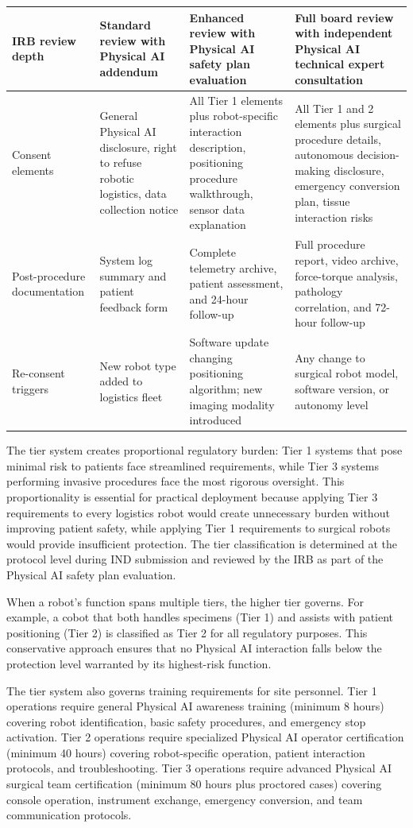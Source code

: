 \begin{table}[H]
\begin{tabularx}{\textwidth}{p{2cm} X X X}
\midrule
IRB review depth & Standard review with Physical AI addendum & Enhanced review with Physical AI safety plan evaluation & Full board review with independent Physical AI technical expert consultation \\
\midrule
Consent elements & General Physical AI disclosure, right to refuse robotic logistics, data collection notice & All Tier 1 elements plus robot-specific interaction description, positioning procedure walkthrough, sensor data explanation & All Tier 1 and 2 elements plus surgical procedure details, autonomous decision-making disclosure, emergency conversion plan, tissue interaction risks \\
\midrule
Post-procedure documentation & System log summary and patient feedback form & Complete telemetry archive, patient assessment, and 24-hour follow-up & Full procedure report, video archive, force-torque analysis, pathology correlation, and 72-hour follow-up \\
\midrule
Re-consent triggers & New robot type added to logistics fleet & Software update changing positioning algorithm; new imaging modality introduced & Any change to surgical robot model, software version, or autonomy level \\
\bottomrule
\end{tabularx}
\end{table}

The tier system creates proportional regulatory burden: Tier 1 systems that
pose minimal risk to patients face streamlined requirements, while Tier 3
systems performing invasive procedures face the most rigorous oversight. This
proportionality is essential for practical deployment because applying Tier 3
requirements to every logistics robot would create unnecessary burden without
improving patient safety, while applying Tier 1 requirements to surgical robots
would provide insufficient protection. The tier classification is determined at
the protocol level during IND submission and reviewed by the IRB as part of the
Physical AI safety plan evaluation.

When a robot's function spans multiple tiers, the higher tier governs. For
example, a cobot that both handles specimens (Tier 1) and assists with patient
positioning (Tier 2) is classified as Tier 2 for all regulatory purposes. This
conservative approach ensures that no Physical AI interaction falls below the
protection level warranted by its highest-risk function.

The tier system also governs training requirements for site personnel. Tier 1
operations require general Physical AI awareness training (minimum 8 hours)
covering robot identification, basic safety procedures, and emergency stop
activation. Tier 2 operations require specialized Physical AI operator
certification (minimum 40 hours) covering robot-specific operation, patient
interaction protocols, and troubleshooting. Tier 3 operations require advanced
Physical AI surgical team certification (minimum 80 hours plus proctored cases)
covering console operation, instrument exchange, emergency conversion, and
team communication protocols.

